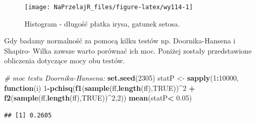 \documentclass[polish,]{book}
\newenvironment{Shaded}{\begin{snugshade}}{\end{snugshade}}
\newcommand{\CommentTok}[1]{\textcolor[rgb]{0.56,0.35,0.01}{\textit{#1}}}
\newcommand{\ControlFlowTok}[1]{\textcolor[rgb]{0.13,0.29,0.53}{\textbf{#1}}}
\newcommand{\DecValTok}[1]{\textcolor[rgb]{0.00,0.00,0.81}{#1}}
\newcommand{\FloatTok}[1]{\textcolor[rgb]{0.00,0.00,0.81}{#1}}
\newcommand{\KeywordTok}[1]{\textcolor[rgb]{0.13,0.29,0.53}{\textbf{#1}}}
\newcommand{\NormalTok}[1]{#1}
\newcommand{\OperatorTok}[1]{\textcolor[rgb]{0.81,0.36,0.00}{\textbf{#1}}}
\newcommand{\OtherTok}[1]{\textcolor[rgb]{0.56,0.35,0.01}{#1}}
\newcommand{\StringTok}[1]{\textcolor[rgb]{0.31,0.60,0.02}{#1}}
\begin{document}
\begin{figure}[h]

{\centering \texttt{[image: NaPrzelajR\_files/figure-latex/wy114-1]} 

}

\caption{Histogram - długość płatka irysa, gatunek setosa.}\label{fig:wy114}
\end{figure}

Gdy badamy normalność za pomocą kilku testów np. Doornika-Hansena i Shapiro-
Wilka zawsze warto porównać ich moc. Poniżej zostały przedstawione obliczenia
dotyczące mocy obu testów.

\begin{Shaded}
\begin{Highlighting}[]
\CommentTok{# moc testu Doornika-Hansena:}
\KeywordTok{set.seed}\NormalTok{(}\DecValTok{2305}\NormalTok{)}
\NormalTok{statP <-}\StringTok{ }\KeywordTok{sapply}\NormalTok{(}\DecValTok{1}\OperatorTok{:}\DecValTok{10000}\NormalTok{, }\ControlFlowTok{function}\NormalTok{(i) }
  \DecValTok{1}\OperatorTok{-}\KeywordTok{pchisq}\NormalTok{(}\KeywordTok{f1}\NormalTok{(}\KeywordTok{sample}\NormalTok{(ff,}\KeywordTok{length}\NormalTok{(ff),}\OtherTok{TRUE}\NormalTok{))}\OperatorTok{^}\DecValTok{2} \OperatorTok{+}\StringTok{ }\KeywordTok{f2}\NormalTok{(}\KeywordTok{sample}\NormalTok{(ff,}\KeywordTok{length}\NormalTok{(ff),}\OtherTok{TRUE}\NormalTok{))}\OperatorTok{^}\DecValTok{2}\NormalTok{,}\DecValTok{2}\NormalTok{))}
\KeywordTok{mean}\NormalTok{(statP}\OperatorTok{<}\StringTok{ }\FloatTok{0.05}\NormalTok{)}
\end{Highlighting}
\end{Shaded}

\begin{verbatim}
## [1] 0.2605
\end{verbatim}

\begin{Shaded}
\end{Shaded}
\end{document}
